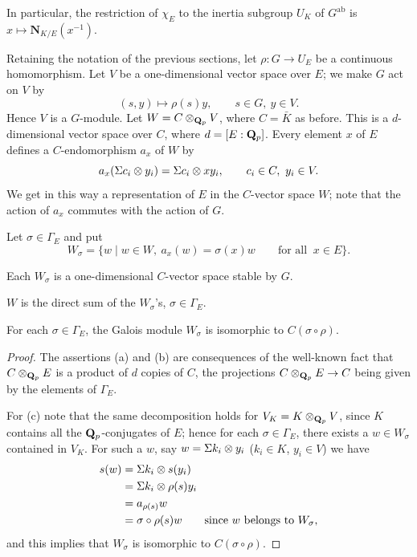 In particular, the restriction of $\chi_E$ to the inertia subgroup
$U_K$ of $G^{\mathrm{ab}}$ is $x\mapsto \mathbf{N}_{K/E}(x^{-1})$.


Retaining the notation of the previous sections, let
$\rho\colon G\to U_E$ be a continuous homomorphism.  Let $V$ be a
one-dimensional vector space over $E$; we make $G$ act on $V$ by
\[
(s,y)\mapsto \rho(s)y,\qquad s\in G,\ y\in V.
\]
Hence $V$ is a $G$-module.  Let $W=C\mathbin{\otimes}_{\mathbf{Q}_p}V$, where $C=\bar K$ as
before.  This is a $d$-dimensional vector space over $C$, where
$d=[E:\mathbf{Q}_p]$.  Every element $x$ of $E$ defines a $C$-endomorphism
$a_x$ of $W$ by
\[
a_x(\Sigma c_i\mathbin{\otimes} y_i)=\Sigma c_i\mathbin{\otimes} xy_i,\qquad
c_i\in C,\ y_i\in V.
\]
We get in this way a representation of $E$ in the $C$-vector space $W$;
note that the action of $a_x$ commutes with the action of $G$.

Let $\sigma\in\Gamma_E$ and put
\[
W_\sigma=\{w \mid w\in W,\ a_x(w)=\sigma(x)w \qquad\text{for all }\
x\in E\}.
\]

\begin{lemma}[1]\label{lem:III.A.5.1}
\begin{alist}
\item Each $W_\sigma$ is a one-dimensional $C$-vector space stable by
$G$.
\item $W$ is the direct sum of the $W_\sigma$'s, $\sigma\in\Gamma_E$.
\item For each $\sigma\in\Gamma_E$, the Galois module $W_\sigma$ is
isomorphic to $C(\sigma\circ\rho)$.
\end{alist}
{}
\end{lemma}

\begin{proof}
The assertions (a) and (b) are consequences of the well-known fact that
$C\mathbin{\otimes}_{\mathbf{Q}_p}E$ is a product of $d$ copies of $C$, the projections
$C\mathbin{\otimes}_{\mathbf{Q}_p}E\to C$ being given by the elements of $\Gamma_E$.

For (c) note that the same decomposition holds for
$V_K=K\mathbin{\otimes}_{\mathbf{Q}_p}V$, since $K$ contains all the $\mathbf{Q}_p$-conjugates of
$E$; hence for each $\sigma\in\Gamma_E$, there exists a $w\in W_\sigma$
contained in $V_K$.  For such a $w$, say
$w=\Sigma k_i\mathbin{\otimes} y_i$ ($k_i\in K$, $y_i\in V$) we have
\begin{align*}
s(w)&=\Sigma k_i\mathbin{\otimes} s(y_i)\\
&=\Sigma k_i\mathbin{\otimes} \rho(s)y_i\\
&=a_{\rho(s)}w\\
&=\sigma\circ\rho(s)w \qquad\text{since } w \text{ belongs to }
W_\sigma,
\end{align*}
and this implies that $W_\sigma$ is isomorphic to $C(\sigma\circ\rho)$.
\end{proof}

